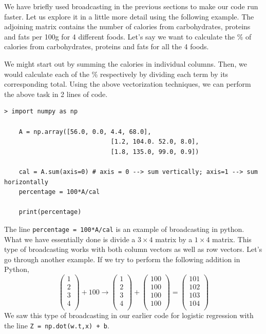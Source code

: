 \documentclass{article}[a4paper,12pt]
\theoremstyle{definition}
\begin{document}
We have briefly used broadcasting in the previous sections to make our code run faster. Let us explore it in a little more detail using the following example. The adjoining matrix contains the number of calories from carbohydrates, proteins and fats per 100g for 4 different foods. Let's say we want to calculate the \% of calories from carbohydrates, proteins and fats for all the 4 foods.  
\vspace{-6pt}

We might start out by summing the calories in individual columns. Then, we would calculate each of the \% respectively by dividing each term by its corresponding total. Using the above vectorization techniques, we can perform the above task in 2 lines of code.
\begin{Verbatim}[tabsize=2]
> import numpy as np
	
	A = np.array([56.0, 0.0, 4.4, 68.0],
							 [1.2, 104.0. 52.0, 8.0],
							 [1.8, 135.0, 99.0, 0.9])
	
	cal = A.sum(axis=0) # axis = 0 --> sum vertically; axis=1 --> sum horizontally
	percentage = 100*A/cal
	
	print(percentage)
\end{Verbatim}
The line \texttt{percentage = 100*A/cal} is an example of broadcasting in python. What we have essentially done is divide a $3\times 4$ matrix by a $1\times 4$ matrix. This type of broadcasting works with both column vectors as well as row vectors. Let's go through another example. If we try to perform the following addition in Python,
$$\begin{pmatrix}
	1 \\
	2 \\
	3 \\
	4 \\
\end{pmatrix} +100\longrightarrow
\begin{pmatrix}
	1 \\
	2 \\
	3 \\
	4 \\
\end{pmatrix}+
\begin{pmatrix}
	100 \\
	100 \\
	100 \\
	100 \\
\end{pmatrix}=
\begin{pmatrix}
	101 \\
	102 \\
	103 \\
	104 \\
\end{pmatrix}$$
We saw this type of broadcasting in our earlier code for logistic regression with the line \texttt{Z = np.dot(w.t,x) + b}.
\end{document}

